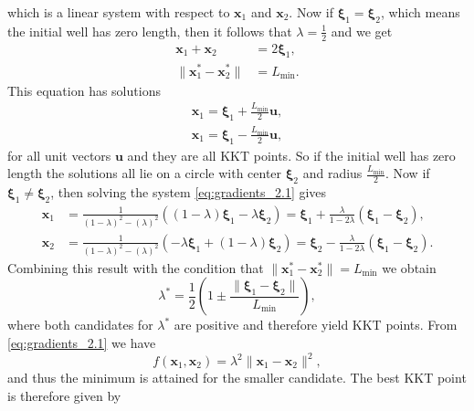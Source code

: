 %
which is a linear system with respect to $\textbf{x}_1$ and $\textbf{x}_2$.
Now if $\boldsymbol{\xi}_1 = \boldsymbol{\xi}_2$, which means the initial well has zero length,
then it follows that $\lambda=\frac{1}{2}$ and we get
%
\begin{align}
\textbf{x}_1 + \textbf{x}_2 &= 2 \boldsymbol{\xi}_1, \\
\| \textbf{x}_1^* - \textbf{x}_2^*\| &= L_{\min}.
\label{eq:zero_length_solution}
\end{align}
%
This equation has solutions
\begin{align}
\textbf{x}_1 = \boldsymbol{\xi}_1 + \frac{L_{\min}}{2} \textbf{u} , \\
\textbf{x}_1 = \boldsymbol{\xi}_1 - \frac{L_{\min}}{2} \textbf{u} ,
\label{eq:zero_length_solutions}
\end{align}
for all unit vectors $\textbf{u}$ and they are all KKT points. So if the initial 
well has zero length the solutions all lie on a circle with center $\boldsymbol{\xi}_2$ 
and radius $\frac{L_{\min}}{2}$.
%
Now if $\boldsymbol{\xi}_1 \neq \boldsymbol{\xi}_2$, then 
solving the system \eqref{eq:gradients_2.1} gives
%
\begin{equation}
\begin{aligned}
\textbf{x}_1 &=  \frac{1}{(1-\lambda)^2 -(\lambda)^2 } \left( (1-\lambda) \boldsymbol{\xi}_1 - \lambda \boldsymbol{\xi}_2 \right) 
= \boldsymbol{\xi}_1 + \frac{\lambda}{1 - 2\lambda} (\boldsymbol{\xi}_1 - \boldsymbol{\xi}_2), \\
\textbf{x}_2 &=  \frac{1}{(1-\lambda)^2 -(\lambda)^2 } \left(-\lambda \boldsymbol{\xi}_1 + (1-\lambda) \boldsymbol{\xi}_2 \right)
= \boldsymbol{\xi}_2 - \frac{\lambda}{1 - 2\lambda} (\boldsymbol{\xi}_1 - \boldsymbol{\xi}_2).
\end{aligned}
\label{eq:solutions_2.2}
\end{equation}
%
Combining this result with the condition that $\| \textbf{x}_1^* - \textbf{x}_2^*\| = L_{\min}$ we obtain
%
\begin{equation}
\lambda^* = \frac{1}{2} \left( 1 \pm \frac{\| \boldsymbol{\xi}_1 - \boldsymbol{\xi}_2 \|}{L_{\min}} \right),
\label{eq:solutions_lambda_2.2}
\end{equation}
%
where both candidates for $\lambda^*$ are positive and therefore yield KKT points.
From \eqref{eq:gradients_2.1} we have
%
\begin{equation}
f(\textbf{x}_1,\textbf{x}_2) = \lambda^2 \| \textbf{x}_1 - \textbf{x}_2\|^2,
\label{eq:well_length_min}
\end{equation}
%
and thus the minimum is attained for the smaller candidate. The best KKT point is therefore given by


